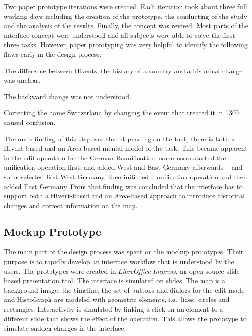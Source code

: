Two paper prototype iterations were created. Each iteration took about three full working days including the creation of the prototype, the conducting of the study and the analysis of the results. Finally, the concept was revised.
Most parts of the interface concept were understood and all subjects were able to solve the first three tasks. However, paper prototyping was very helpful to identify the following flaws early in the design process:

\begin{compactenum}
  \item The difference between Hivents, the history of a country and a historical change was unclear.
  \item The backward change was not understood.
  \item Correcting the name Switzerland by changing the event that created it in 1300 caused confusion.
\end{compactenum}

The main finding of this step was that depending on the task, there is both a Hivent-based and an Area-based mental model of the task. This became apparent in the edit operation for the German Reunification: some users started the unification operation first, and added West and East Germany afterwards -- and some selected first West Germany, then initiated a unification operation and then added East Germany. From that finding was concluded that the interface has to support both a Hivent-based and an Area-based approach to introduce historical changes and correct information on the map.


\subsection{Mockup Prototype} %
\label{sub:mockup_prototype}

The main part of the design process was spent on the mockup prototypes. Their purpose is to rapidly develop an interface workflow that is understood by the users. The prototypes were created in \emph{LibreOffice Impress}, an open-source slide-based presentation tool. The interface is simulated on slides. The map is a background image, the timeline, the set of buttons and dialogs for the edit mode and HistoGraph are modeled with geometric elements, i.e.\ lines, circles and rectangles. Interactivity is simulated by linking a click on an element to a different slide that shows the effect of the operation. This allows the prototype to simulate sudden changes in the interface.


